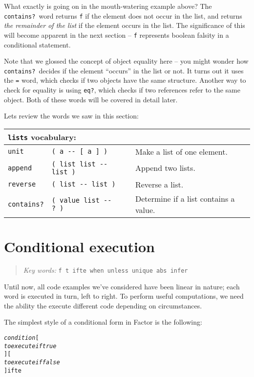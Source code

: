 \documentclass[english]{book}
\newcommand{\chapkeywords}[1]{%
\begin{quote}
\emph{Key words:} \texttt{#1}
\end{quote}
}
\newcommand{\wordtable}[1]{{
\begin{tabularx}{12cm}{|l l X|}
#1
\hline
\end{tabularx}}}
\newcommand{\tabvocab}[1]{
\hline
\multicolumn{3}{|l|}{
\rule[-2mm]{0mm}{6mm}
\texttt{#1} vocabulary:}
\\
\hline
}
\begin{document}
What exactly is going on in the mouth-watering example above? The \texttt{contains?}~word returns \texttt{f} if the element does not occur in the list, and returns \emph{the remainder of the list} if the element occurs in the list. The significance of this will become apparent in the next section -- \texttt{f} represents boolean falsity in a conditional statement.

Note that we glossed the concept of object equality here -- you might wonder how \texttt{contains?}~decides if the element ``occurs'' in the list or not. It turns out it uses the \texttt{=} word, which checks if two objects have the same structure. Another way to check for equality is using \texttt{eq?}, which checks if two references refer to the same object. Both of these words will be covered in detail later.

Lets review the words we saw in this section:

\wordtable{
\tabvocab{lists}
\texttt{unit}&
\texttt{( a -{}- {[} a {]} )}&
Make a list of one element.\\
\texttt{append}&
\texttt{( list list -{}- list )}&
Append two lists.\\
\texttt{reverse}&
\texttt{( list -{}- list )}&
Reverse a list.\\
\texttt{contains?}&
\texttt{( value list -{}- ?~)}&
Determine if a list contains a value.\\}

\section{Conditional execution}

\chapkeywords{f t ifte when unless unique abs infer}

Until now, all code examples we've considered have been linear in nature; each word is executed in turn, left to right. To perform useful computations, we need the ability the execute different code depending on circumstances.

The simplest style of a conditional form in Factor is the following:

\begin{alltt}
\emph{condition} {[}
    \emph{to execute if true}
{] [}
    \emph{to execute if false}
{]} ifte
\end{alltt}
\end{document}
